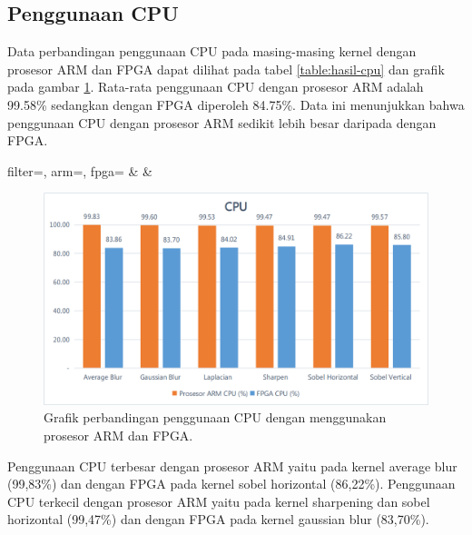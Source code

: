 \subsection{Penggunaan CPU}
Data perbandingan penggunaan CPU pada masing-masing kernel dengan prosesor ARM dan FPGA dapat dilihat pada tabel \ref{table:hasil-cpu} dan grafik pada gambar \ref{fig:chart-cpu}. Rata-rata penggunaan CPU dengan prosesor ARM adalah 99.58\% sedangkan dengan FPGA diperoleh 84.75\%. Data ini menunjukkan bahwa penggunaan CPU dengan prosesor ARM sedikit lebih besar daripada dengan FPGA.
\begin{atable}
    \caption{Tabel perbandingan penggunaan CPU dengan menggunakan prosesor ARM dan FPGA.}
    \label{table:hasil-cpu}
        {
            filter=\filter, 
            arm=\arm, 
            fpga=\fpga}
        {
            \filter & 
            \arm & 
            \fpga }
\end{atable}
\begin{figure}[H]
    \includegraphics[width=0.81\linewidth, center]{images/chart/chart-cpu.png}
    \caption{Grafik perbandingan penggunaan CPU dengan menggunakan prosesor ARM dan FPGA.}
    \label{fig:chart-cpu}
\end{figure}
Penggunaan CPU terbesar dengan prosesor ARM yaitu pada kernel average blur (99,83\%) dan dengan FPGA pada kernel sobel horizontal (86,22\%). Penggunaan CPU terkecil dengan prosesor ARM yaitu pada kernel sharpening dan sobel horizontal (99,47\%) dan dengan FPGA pada kernel gaussian blur (83,70\%).


